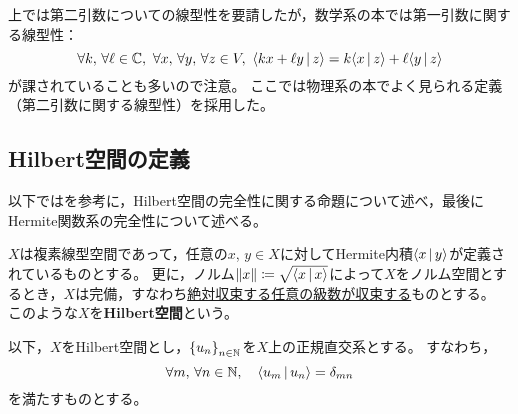 \documentclass[a4paper,draft]{ltjsarticle}
\begin{document}
\begin{rem}
    上では第二引数についての線型性を要請したが，数学系の本では第一引数に関する線型性：
    \begin{equation}
        \forall k,\,\forall \ell\in\CC,\ \forall x,\,\forall y,\, \forall z\in V,\ \inner{kx+\ell y}{z}=k\inner{x}{z}+\ell\inner{y}{z}
    \end{equation}
    が課されていることも多いので注意。
    ここでは物理系の本でよく見られる定義（第二引数に関する線型性）を採用した。
\end{rem}

\subsection{Hilbert空間の定義}
以下では\cite[野村]{nomura}を参考に，Hilbert空間の完全性に関する命題について述べ，最後にHermite関数系の完全性について述べる。

\begin{defi}[Hilbert空間]
    $X$は複素線型空間であって，任意の$x$, $y\in X$に対してHermite内積$\inner{x}{y}$が定義されているものとする。
    更に，ノルム$\norm{x}\coloneqq \sqrt{\inner{x}{x}}$によって$X$をノルム空間とするとき，$X$は完備，すなわち\underline{絶対収束する任意の級数が収束する}ものとする。
    このような$X$を\textbf{Hilbert空間}という。
\end{defi}

以下，$X$をHilbert空間とし，$\seq{u_n}{n\in\N}$を$X$上の正規直交系とする。
すなわち，
\begin{equation}
    \forall m,\,\forall n\in\N,\quad \inner{u_m}{u_n}=\delta_{mn}
\end{equation}
を満たすものとする。
\end{document}
